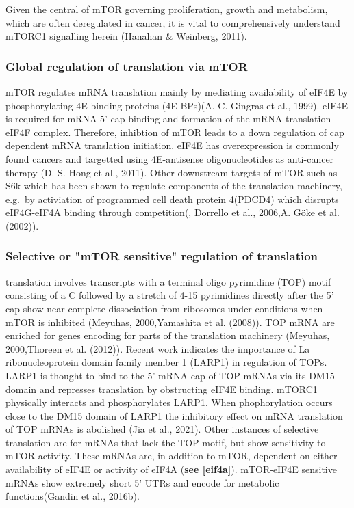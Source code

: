 \documentclass[12pt,openany]{book}
\begin{document}
Given the central of mTOR governing proliferation, growth and
metabolism, which are often deregulated in cancer, it is vital to
comprehensively understand mTORC1 signalling herein (Hanahan \&
Weinberg, 2011).

\subsubsection{Global regulation of translation via mTOR}

mTOR regulates mRNA translation mainly by mediating availability of
eIF4E by phosphorylating 4E binding proteins (4E-BPs)(A.-C. Gingras et
al., 1999). eIF4E is required for mRNA 5' cap binding and formation of
the mRNA translation eIF4F complex. Therefore, inhibtion of mTOR leads
to a down regulation of cap dependent mRNA translation initiation. eIF4E
has overexpression is commonly found cancers and targetted using
4E-antisense oligonucleotides as anti-cancer therapy (D. S. Hong et al.,
2011). Other downstream targets of mTOR such as S6k which has been shown
to regulate components of the translation machinery, e.g.~by activiation
of programmed cell death protein 4(PDCD4) which disrupts eIF4G-eIF4A
binding through competition(, Dorrello et al., 2006,A. Göke et al.
(2002)).

\subsubsection{Selective or "mTOR sensitive" regulation of translation}

translation involves transcripts with a terminal oligo pyrimidine (TOP)
motif consisting of a C followed by a stretch of 4-15 pyrimidines
directly after the 5' cap show near complete dissociation from ribosomes
under conditions when mTOR is inhibited (Meyuhas, 2000,Yamashita et al.
(2008)). TOP mRNA are enriched for genes encoding for parts of the
translation machinery (Meyuhas, 2000,Thoreen et al. (2012)). Recent work
indicates the importance of La ribonucleoprotein domain family member 1
(LARP1) in regulation of TOPs. LARP1 is thought to bind to the 5' mRNA
cap of TOP mRNAs via its DM15 domain and represses translation by
obstructing eIF4E binding. mTORC1 physically interacts and
phosphorylates LARP1. When phophorylation occurs close to the DM15
domain of LARP1 the inhibitory effect on mRNA translation of TOP mRNAs
is abolished (Jia et al., 2021). Other instances of selective
translation are for mRNAs that lack the TOP motif, but show sensitivity
to mTOR activity. These mRNAs are, in addition to mTOR, dependent on
either availability of eIF4E or activity of eIF4A (\textbf{see
\ref{eif4a}}). mTOR-eIF4E sensitive mRNAs show extremely short 5' UTRs
and encode for metabolic functions(Gandin et al., 2016b).
\end{document}
